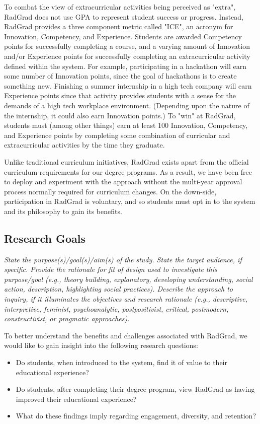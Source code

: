 \documentclass[acmsmall]{acmart}
\begin{document}
To combat the view of extracurricular activities being perceived as "extra", RadGrad does not use GPA to represent student success or progress. Instead, RadGrad provides a three component metric called "ICE", an acronym for Innovation, Competency, and Experience. Students are awarded Competency points for successfully completing a course, and a varying amount of Innovation and/or Experience points for successfully completing an extracurricular activity defined within the system. For example, participating in a hackathon will earn some number of Innovation points, since the goal of hackathons is to create something new.  Finishing a summer internship in a high tech company will earn Experience points since that activity provides students with a sense for the demands of a high tech workplace environment. (Depending upon the nature of the internship, it could also earn Innovation points.) To "win" at RadGrad, students must (among other things) earn at least 100 Innovation, Competency, and Experience points by completing some combination of curricular and extracurricular activities by the time they graduate.

Unlike traditional curriculum initiatives, RadGrad exists apart from the official curriculum requirements for our degree programs. As a result, we have been free to deploy and experiment with the approach without the multi-year approval process normally required for curriculum changes.  On the down-side, participation in RadGrad is voluntary, and so students must opt in to the system and its philosophy to gain its benefits.

\subsection{Research Goals}
{\em\small State the purpose(s)/goal(s)/aim(s) of the study. State the target audience, if specific. Provide the rationale for fit of design used to investigate this purpose/goal (e.g., theory building, explanatory, developing understanding, social action, description, highlighting social practices). Describe the approach to inquiry, if it illuminates the objectives and research rationale (e.g., descriptive, interpretive, feminist, psychoanalytic, postpositivist, critical, postmodern, constructivist, or pragmatic approaches).}

To better understand the benefits and challenges associated with RadGrad, we would like to gain insight into the following research questions:

\begin{itemize}
\item Do students, when introduced to the system, find it of value to their educational experience?
\item Do students, after completing their degree program, view RadGrad as having improved their educational experience?
\item What do these findings imply regarding engagement, diversity, and retention?
\end{itemize}
\end{document}
